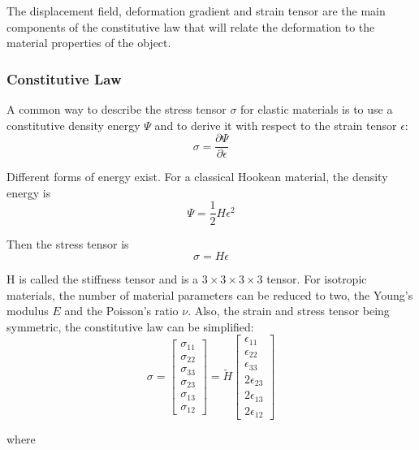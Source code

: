 The displacement field, deformation gradient and strain tensor are the main components of the constitutive law that will relate the deformation to the material properties of the object.

\subsubsection{Constitutive Law}
A common way to describe the stress tensor $\sigma$ for elastic materials is to use a constitutive density energy $\Psi$ and to derive it with respect to the strain tensor $\epsilon$:
\begin{equation}
\sigma = \frac{\partial \Psi}{\partial \epsilon}
\end{equation}

Different forms of energy exist. For a classical Hookean material, the density energy is
\begin{equation}
\Psi = \frac{1}{2}H\epsilon^{2}
\end{equation}

Then the stress tensor is
\begin{equation}
\sigma = H\epsilon
\end{equation}

H is called the stiffness tensor and is a $3\times3\times3\times3$ tensor. For isotropic materials, the number of material parameters can be reduced to two, the Young's modulus $E$ and the Poisson's ratio $\nu$. Also, the strain and stress tensor being symmetric, the constitutive law can be simplified:
\begin{equation}
\sigma = 
\begin{bmatrix}
\sigma_{11} \\
\sigma_{22} \\
\sigma_{33} \\
\sigma_{23} \\
\sigma_{13} \\
\sigma_{12}
\end{bmatrix}
=
\tilde{H}
\begin{bmatrix}
\epsilon_{11} \\
\epsilon_{22} \\
\epsilon_{33} \\
2\epsilon_{23} \\
2\epsilon_{13} \\
2\epsilon_{12}
\end{bmatrix}
\end{equation}

where

